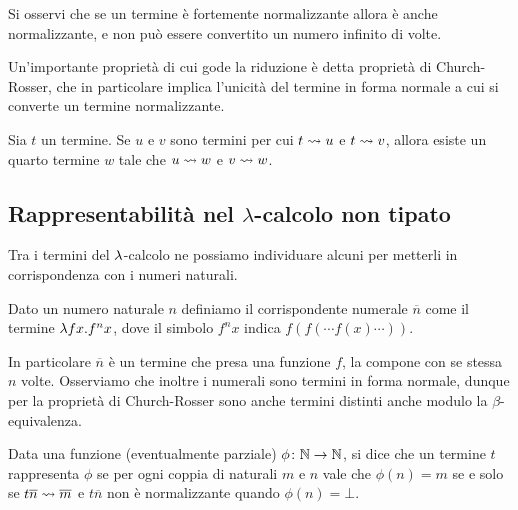 \documentclass[]{marticle}
\begin{document}
Si osservi che se un termine \`e fortemente normalizzante allora \`e anche
normalizzante, e non pu\`o essere convertito un numero infinito di volte.


Un'importante propriet\`a di cui gode la riduzione \`e detta propriet\`a di
Church-Rosser, che in particolare implica l'unicit\`a del termine in forma
normale a cui si converte un termine normalizzante.

\begin{block}[Teorema]
    Sia $t$ un termine. Se $u$ e $v$ sono termini per cui $t\rightsquigarrow u$ e $t\rightsquigarrow
    v$, allora esiste un quarto termine $w$ tale che $u\rightsquigarrow w$ e $v\rightsquigarrow w$.
\end{block}

\subsection{Rappresentabilit\`a nel $\lambda$-calcolo non tipato}

Tra i termini del $\lambda$-calcolo ne possiamo individuare alcuni per metterli in
corrispondenza con i numeri naturali.

\begin{block}[Definizione]
    Dato un numero naturale $n$ definiamo il corrispondente numerale
    $\overline{n}$ come il termine $\lambda f x. f^n x$, dove il simbolo $f^n x$
    indica $f(f(\cdots f(x) \cdots))$.
\end{block}

In particolare $\overline{n}$ \`e un termine che presa una funzione $f$, la
compone con se stessa $n$ volte. Osserviamo che inoltre i numerali sono termini
in forma normale, dunque per la propriet\`a di Church-Rosser sono anche termini
distinti anche modulo la $\beta$-equivalenza.

\begin{block}[Definizione]
    Data una funzione (eventualmente parziale) $\phi\colon \mathbb{N} \rightarrow \mathbb{N}$,
    si dice che un termine $t$ rappresenta $\phi$ se per ogni coppia di naturali
    $m$ e $n$ vale che $\phi(n)=m$ se e solo se $t\overline{n}\rightsquigarrow\overline{m}$
    e $t\overline{n}$ non \`e normalizzante quando $\phi(n)=\bot$.
\end{block}
\end{document}
